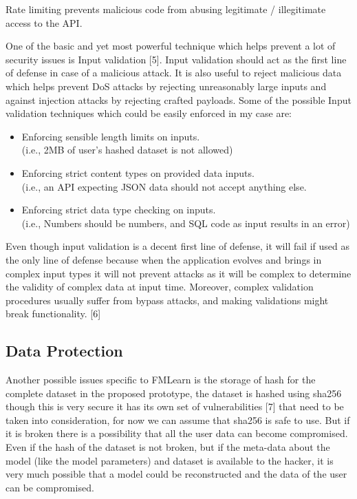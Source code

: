 Rate limiting prevents malicious code from abusing legitimate / illegitimate access to the API.

One of the basic and yet most powerful technique which helps prevent a lot of security issues is Input validation [5]. Input validation should act as the first line of defense in case of a malicious attack. It is also useful to reject malicious data which helps prevent DoS attacks by rejecting unreasonably large inputs and against injection attacks by rejecting crafted payloads. Some of the possible Input validation techniques which could be easily enforced in my case are:

\begin{itemize}
    \item Enforcing sensible length limits on inputs.\\
    (i.e., 2MB of user’s hashed dataset is not allowed)
    \item Enforcing strict content types on provided data inputs.\\
    (i.e., an API expecting JSON data should not accept anything else.
    \item Enforcing strict data type checking on inputs.\\
    (i.e., Numbers should be numbers, and SQL code as input results in an error)
\end{itemize}

Even though input validation is a decent first line of defense, it will fail if used as the only line of defense because when the application evolves and brings in complex input types it will not prevent attacks as it will be complex to determine the validity of complex data at input time. Moreover, complex validation procedures usually suffer from bypass attacks, and making validations might break functionality. [6]

\subsection{Data Protection}
Another possible issues specific to FMLearn is the storage of hash for the complete dataset in the proposed prototype, the dataset is hashed using sha256 though this is very secure it has its own set of vulnerabilities [7] that need to be taken into consideration, for now we can assume that sha256 is safe to use. But if it is broken there is a possibility that all the user data can become compromised. Even if the hash of the dataset is not broken, but if the meta-data about the model (like the model parameters) and dataset is available to the hacker, it is very much possible that a model could be reconstructed and the data of the user can be compromised.

